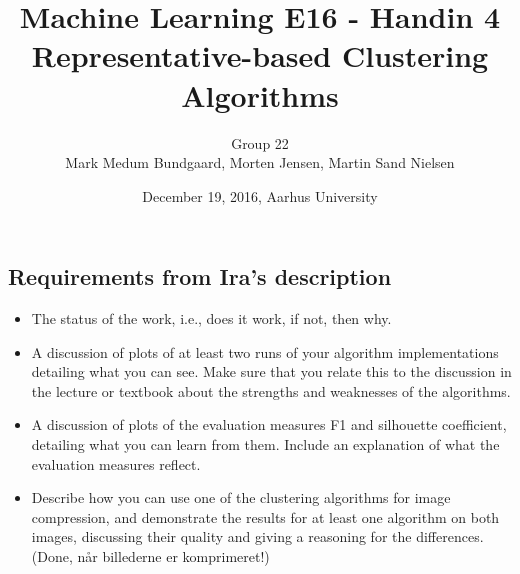 \documentclass[a4paper,10pt,article,oneside,english]{memoir}
\begin{document}
	\title{Machine Learning E16 - Handin 4\\
		Representative-based Clustering Algorithms}
	\author{Group 22\\
		Mark Medum Bundgaard, Morten Jensen, Martin Sand Nielsen}
	\date{December 19, 2016, Aarhus University}
	
	\mainmatter
	\maketitle


\subsection{Requirements from Ira's description}
\begin{itemize}
	\item The status of the work, i.e., does it work, if not, then why.
	\item A discussion of plots of at least two runs of your algorithm implementations detailing what you can see. Make sure that you relate this to the discussion in the lecture or textbook about the strengths and weaknesses of the algorithms.
	\item A discussion of plots of the evaluation measures F1 and silhouette coefficient, detailing what you can learn from them. Include an explanation of what the evaluation measures reflect.
	\item Describe how you can use one of the clustering algorithms for image compression, and demonstrate the results for at least one algorithm on both images, discussing their quality and giving a reasoning for the differences. (Done, når billederne er komprimeret!)
\end{itemize}
\end{document}
